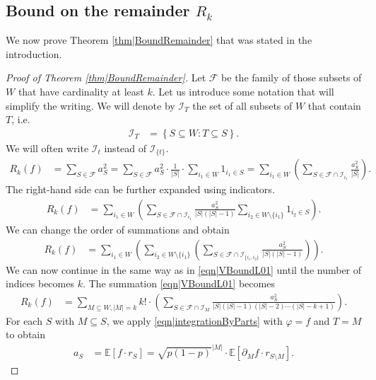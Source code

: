 \documentclass[reqno]{amsart}
\begin{document}
\subsection{Bound on the remainder $R_k$}\label{subs|ProofRk} We now prove Theorem \ref{thm|BoundRemainder} that was stated in the introduction. 
\begin{proof}[Proof of Theorem \ref{thm|BoundRemainder}]   
 Let $\mathcal F$ be the family of those subsets of $W$ that have cardinality at least $k$.  
Let us introduce some notation that will simplify the writing. We will denote by $\mathcal I_T$ the set of all subsets of $W$ that contain $T$, i.e. 
\begin{align*}
\mathcal I_T&=\left\{S\subseteq W: T\subseteq S\right\}.
\end{align*}
We will often write $\mathcal I_t$ instead of $\mathcal I_{\{t\}}$. 
\begin{align*}
R_k(f)&=\sum_{S\in\mathcal F} a_S^2= \sum_{S\in\mathcal F}a_S^2\cdot\frac1{|S|}\cdot \sum_{i_1\in W} 1_{i_1\in S}=
\sum_{i_1\in W}\left(\sum_{S\in\mathcal F\cap\mathcal I_{i_1}}\frac{a_S^2}{|S|}\right).
\end{align*}
The right-hand side can be further expanded using indicators.
\begin{align*}
R_k(f)
&=\sum_{i_1\in W}\left(\sum_{S\in\mathcal F\cap\mathcal I_{i_1}}\frac{a_S^2}{|S|(|S|-1)}\sum_{i_2\in W\setminus\{i_1\}} 1_{i_2\in S}\right).\end{align*}
We can change the order of summations and obtain 
\begin{align}
R_k(f)
&=\sum_{i_1\in W}\left(\sum_{i_2\in W\setminus\{i_1\}}\left(\sum_{S\in\mathcal F\cap \mathcal I_{\{i_1,i_2\}}}\frac{a_S^2}{|S|(|S|-1)}\right)\right).
\label{eqn|VBoundL01}
 \end{align}
 We can now continue in the same way as in \eqref{eqn|VBoundL01} until the number of indices becomes $k$. 
 The summation \eqref{eqn|VBoundL01} becomes 
 \begin{align} 
R_k(f)
 &=\sum_{M\subseteq W, |M|=k}k!\cdot \left(\sum_{S\in\mathcal F\cap\mathcal I_M}\frac{a_S^2}{|S|(|S|-1)(|S|-2)\cdots (|S|-k+1)}\right). \label{eqn|VBoundL01P5}
\end{align}
For each $S$ with $M\subseteq S$, we apply \eqref{eqn|integrationByParts} with $\varphi=f$ and $T=M$ to obtain
\begin{align} a_S&=\mathbb E\left[f\cdot r_S\right]= \sqrt{p(1-p)}^{|M|}\cdot\mathbb E\left[\partial_Mf\cdot r_{S\setminus M}\right]. 
\label{eqn|VBoundL01P7}
\end{align}

\end{proof}
\end{document}
